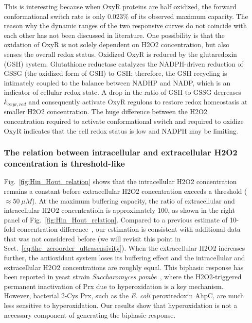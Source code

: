 \documentclass[10pt]{article}
\begin{document}
This is interesting because when OxyR proteins are half oxidized, the forward conformational switch rate is only 0.023\% of its observed maximum capacity. The reason why the dynamic ranges of the two responsive curves do not coincide with each other has not been discussed in literature. One possibility is that the oxidation of OxyR is not solely dependent on H2O2 concentration, but also senses the overall redox status. Oxidized OxyR is reduced by the glutaredoxin (GSH) system. Glutathione reductase catalyzes the NADPH-driven reduction of GSSG (the oxidized form of GSH) to GSH; therefore, the GSH recycling is intimately coupled to the balance between NADHP and NADP, which is an indicator of cellular redox state. A drop in the ratio of GSH to GSSG decreases $k_{oxyr,red}$ and consequently activate OxyR regulons to restore redox homeostasis at smaller H2O2 concentration. The huge difference between the H2O2 concentration required to activate conformational switch and required to oxidize OxyR indicates that the cell redox status is low and NADPH may be limiting.

\subsubsection{The relation between intracellular and extracellular H2O2 concentration is threshold-like}

Fig.~\ref{fig:Hin_Hout_relation} shows that the intracellular H2O2 concentration remains a constant before extracellular H2O2 concentration exceeds a threshold ($\approx50~\mu M$). At the maximum buffering capacity, the ratio of extracellular and intracellular H2O2 concentratioin  is approximately 100, as shown in the right panel of Fig.~\ref{fig:Hin_Hout_relation}. Compared to a previous estimate of 10-fold concentration difference~\cite{seaver2001hydrogen}, our estimation is consistent with additional data that was not considered before (we will revisit this point in Sect.~\ref{eq:the_zeroorder_ultrasensivity}). When the extracellular H2O2 increases further, the antioxidant system loses its buffering effect and the intracellular and extracellular H2O2 concentrations are roughly equal. This biphasic response has been reported in yeast strain \textit{Saccharomyces pombe}~\cite{tomalin2016increasing}, where the H2O2-triggered permanent inactivation of Prx due to hyperoxidation is a key mechanism. However, bacterial 2-Cys Prx, such as the \textit{E. coli} peroxiredoxin AhpC, are much less sensitive to hyperoxidation. Our results show that hyperoxidation is not a necessary component of generating the biphasic response.
\end{document}
